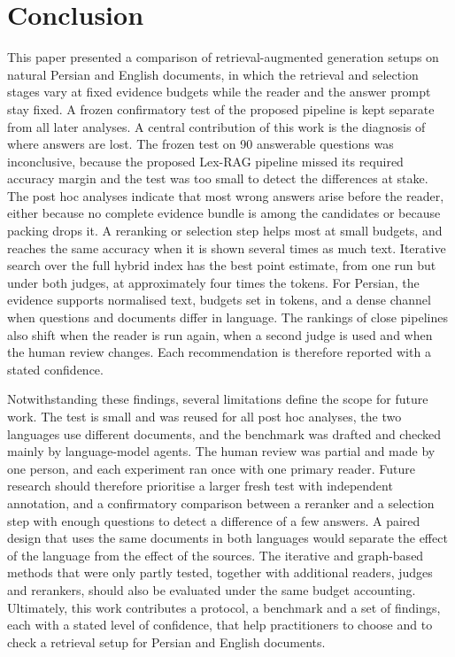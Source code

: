 \section{Conclusion}
\label{sec:conclusion}
This paper presented a comparison of retrieval-augmented generation setups on natural Persian and English documents, in which the retrieval and selection stages vary at fixed evidence budgets while the reader and the answer prompt stay fixed. A frozen confirmatory test of the proposed pipeline is kept separate from all later analyses. A central contribution of this work is the diagnosis of where answers are lost. The frozen test on 90 answerable questions was inconclusive, because the proposed Lex-RAG pipeline missed its required accuracy margin and the test was too small to detect the differences at stake. The post hoc analyses indicate that most wrong answers arise before the reader, either because no complete evidence bundle is among the candidates or because packing drops it. A reranking or selection step helps most at small budgets, and \hybrid{} reaches the same accuracy when it is shown several times as much text. Iterative search over the full hybrid index has the best point estimate, from one run but under both judges, at approximately four times the tokens. For Persian, the evidence supports normalised text, budgets set in tokens, and a dense channel when questions and documents differ in language. The rankings of close pipelines also shift when the reader is run again, when a second judge is used and when the human review changes. Each recommendation is therefore reported with a stated confidence.

Notwithstanding these findings, several limitations define the scope for future work. The test is small and was reused for all post hoc analyses, the two languages use different documents, and the benchmark was drafted and checked mainly by language-model agents. The human review was partial and made by one person, and each experiment ran once with one primary reader. Future research should therefore prioritise a larger fresh test with independent annotation, and a confirmatory comparison between a reranker and a selection step with enough questions to detect a difference of a few answers. A paired design that uses the same documents in both languages would separate the effect of the language from the effect of the sources. The iterative and graph-based methods that were only partly tested, together with additional readers, judges and rerankers, should also be evaluated under the same budget accounting. Ultimately, this work contributes a protocol, a benchmark and a set of findings, each with a stated level of confidence, that help practitioners to choose and to check a retrieval setup for Persian and English documents.

